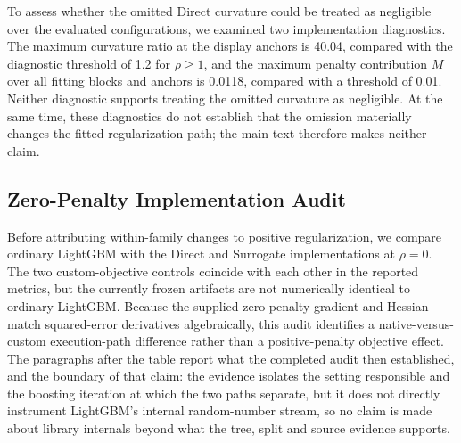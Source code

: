\documentclass[10pt]{article}
\theoremstyle{definition}
\newcommand{\1}{\mathbf{1}}
\begin{document}
To assess whether the omitted Direct curvature could be treated as negligible over the
evaluated configurations, we examined two implementation diagnostics. The maximum
curvature ratio at the display anchors is 40.04, compared with the diagnostic threshold
of 1.2 for $\rho\geq1$, and the maximum penalty contribution $M$ over all fitting blocks
and anchors is 0.0118, compared with a threshold of 0.01. Neither diagnostic supports
treating the omitted curvature as negligible. At the same time, these diagnostics do not
establish that the omission materially changes the fitted regularization path; the main
text therefore makes neither claim.

\subsection{Zero-Penalty Implementation Audit}
\label{subsec:zero_control_results}

Before attributing within-family changes to positive regularization, we compare ordinary LightGBM with the Direct and Surrogate implementations at $\rho=0$. The two custom-objective controls coincide with each other in the reported metrics, but the currently frozen artifacts are not numerically identical to ordinary LightGBM. Because the supplied zero-penalty gradient and Hessian match squared-error derivatives algebraically, this audit identifies a native-versus-custom execution-path difference rather than a positive-penalty objective effect. The paragraphs after the table report what the completed audit then established, and the boundary of that claim: the evidence isolates the setting responsible and the boosting iteration at which the two paths separate, but it does not directly instrument LightGBM's internal random-number stream, so no claim is made about library internals beyond what the tree, split and source evidence supports.
\end{document}
